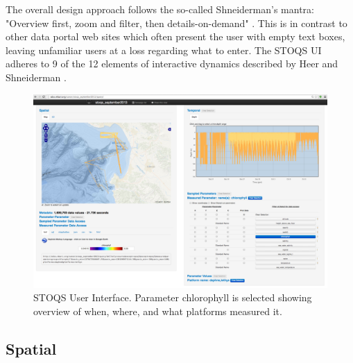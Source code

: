 \documentclass[conference]{IEEEtran}
\begin{document}
The overall design approach follows the so-called Shneiderman's mantra: "Overview first, zoom and filter, then details-on-demand" \cite{Whitney:2012:DIN:2597850}. This is in contrast to other data portal web sites which often present the user with empty text boxes, leaving unfamiliar users at a loss regarding what to enter. The STOQS UI adheres to 9 of the 12 elements of interactive dynamics described by Heer and Shneiderman \cite{Heer:2012:IDV:2133416.2146416}.

\begin{figure}[htbp]
\centering
\includegraphics[width=0.9\linewidth]{STOQSscreencapture.png}
\caption{STOQS User Interface. Parameter chlorophyll is selected showing overview of when, where, and what platforms measured it.}
\label{fig:STOQSscreencapture}
\end{figure}

\subsection{Spatial}
\end{document}
